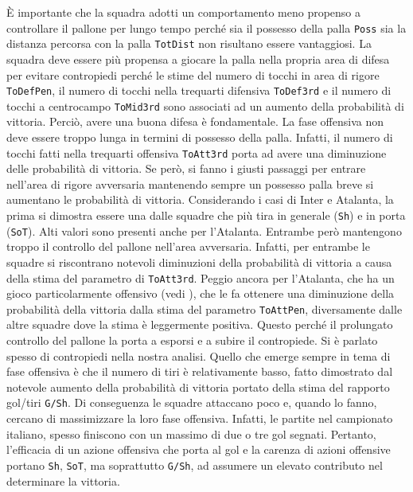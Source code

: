 È importante che la squadra adotti un comportamento meno propenso a controllare il pallone per lungo tempo perché sia il possesso della palla \texttt{Poss} sia la distanza percorsa con la palla \texttt{TotDist} non risultano essere vantaggiosi. La squadra deve essere più propensa a giocare la palla nella propria area di difesa per evitare contropiedi perché le stime del numero di tocchi in area di rigore \texttt{ToDefPen}, il numero di tocchi nella trequarti difensiva \texttt{ToDef3rd} e il numero di tocchi a centrocampo \texttt{ToMid3rd} sono associati ad un aumento della probabilità di vittoria. Perciò, avere una buona difesa è fondamentale. La fase offensiva non deve essere troppo lunga in termini di possesso della palla. Infatti, il numero di tocchi fatti nella trequarti offensiva \texttt{ToAtt3rd} porta ad avere una diminuzione delle probabilità di vittoria. Se però, si fanno i giusti passaggi per entrare nell'area di rigore avversaria mantenendo sempre un possesso palla breve si aumentano le probabilità di vittoria. Considerando i casi di Inter e Atalanta, %
la prima si dimostra essere una dalle squadre che più tira in generale (\texttt{Sh}) e in porta (\texttt{SoT}). Alti valori sono presenti anche per l'Atalanta. Entrambe però mantengono troppo il controllo del pallone nell'area avversaria. Infatti, per entrambe le squadre si riscontrano notevoli diminuzioni della probabilità di vittoria a causa della stima del parametro di \texttt{ToAtt3rd}. Peggio ancora per l'Atalanta, che ha un gioco particolarmente offensivo (vedi \textit{\cite{ataGioco}}), che le fa ottenere una diminuzione della probabilità della vittoria dalla stima del parametro \texttt{ToAttPen}, diversamente dalle altre squadre dove la stima è leggermente positiva. Questo perché il prolungato controllo del pallone la porta a esporsi e a subire il contropiede. Si è parlato spesso di contropiedi nella nostra analisi. Quello che emerge sempre in tema di fase offensiva è che il numero di tiri è relativamente basso, fatto dimostrato dal notevole aumento della probabilità di vittoria portato della stima del rapporto gol/tiri \texttt{G/Sh}. Di conseguenza le squadre attaccano poco e, quando lo fanno, cercano di massimizzare la loro fase offensiva. Infatti, le partite nel campionato italiano, spesso finiscono con un massimo di due o tre gol segnati. Pertanto, l'efficacia di un azione offensiva che porta al gol e la carenza di azioni offensive portano \texttt{Sh}, \texttt{SoT}, ma soprattutto \texttt{G/Sh}, ad assumere un elevato contributo nel determinare la vittoria.\\
